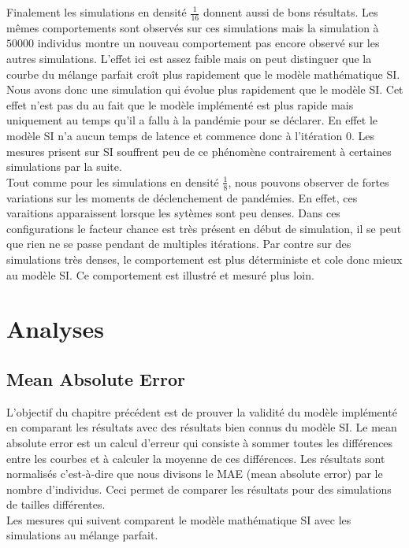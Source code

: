 Finalement les simulations en densité $\frac{1}{16}$ donnent aussi de bons résultats. Les mêmes comportements sont observés sur ces simulations mais la simulation à $50000$ individus montre un nouveau comportement pas encore observé sur les autres simulations. L'effet ici est assez faible mais on peut distinguer que la courbe du mélange parfait croît plus rapidement que le modèle mathématique SI. Nous avons donc une simulation qui évolue plus rapidement que le modèle SI. Cet effet n'est pas du au fait que le modèle implémenté est plus rapide mais uniquement au temps qu'il a fallu à la pandémie pour se déclarer. En effet le modèle SI n'a aucun temps de latence et commence donc à l'itération $0$. Les mesures prisent sur SI souffrent peu de ce phénomène contrairement à certaines simulations par la suite. \\

Tout comme pour les simulations en densité $\frac{1}{8}$, nous pouvons observer de fortes variations sur les moments de déclenchement de pandémies. En effet, ces varaitions apparaissent lorsque les sytèmes sont peu denses. Dans ces configurations le facteur chance est très présent en début de simulation, il se peut que rien ne se passe pendant de multiples itérations. Par contre sur des simulations très denses, le comportement est plus déterministe et cole donc mieux au modèle SI. Ce comportement est illustré et mesuré plus loin.

\section{Analyses}

\subsection{Mean Absolute Error}

L'objectif du chapitre précédent est de prouver la validité du modèle implémenté en comparant les résultats avec des résultats bien connus du modèle SI. Le mean absolute error est un calcul d'erreur qui consiste à sommer toutes les différences entre les courbes et à calculer la moyenne de ces différences. Les résultats sont normalisés c'est-à-dire que nous divisons le MAE (mean absolute error) par le nombre d'individus. Ceci permet de comparer les résultats pour des simulations de tailles différentes.\\

Les mesures qui suivent comparent le modèle mathématique SI avec les simulations au mélange parfait.

